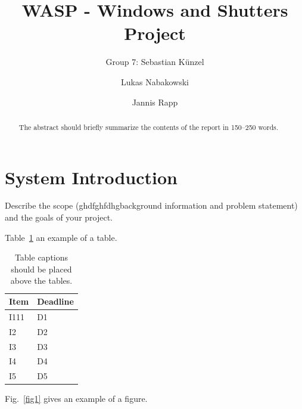 \documentclass[runningheads]{llncs}
\begin{document}
%
\title{WASP - Windows and Shutters Project}

\author{Group 7: Sebastian Künzel \and
Lukas Nabakowski \and
Jannis Rapp}

%
\maketitle              %
%
\begin{abstract}
The abstract should briefly summarize the contents of the report in
150--250 words. 

\end{abstract}
%
%
%
\section{System Introduction}
Describe the scope (ghdfghfdhgbackground information and problem statement) and the goals of your project.

Table~\ref{tab1} an example of a table.

\begin{table}
\caption{Table captions should be placed above the
tables.}\label{tab1}
\begin{tabular}{|l|l|}
\hline
Item & Deadline \\
\hline
I111 & D1 \\
I2 & D2 \\
I3 & D3 \\
I4 & D4 \\
I5 & D5 \\
\hline
\end{tabular}
\end{table}

Fig.~\ref{fig1} gives an example of a figure.
\end{document}
